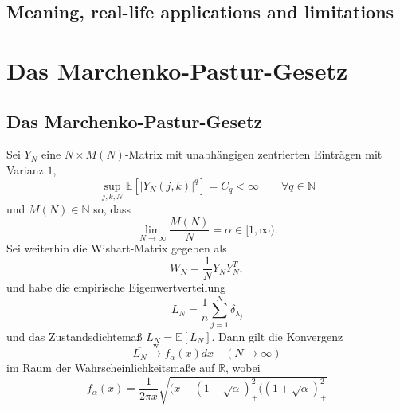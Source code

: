 \documentclass[a4paper, 11pt]{scrreprt}
\newcommand{\RR}{\mathbb{R}}
\newcommand{\EE}{\mathbb{E}}
\newcommand{\NN}{\mathbb{N}}
\begin{document}
\section{Meaning, real-life applications and limitations}

\chapter{Das Marchenko-Pastur-Gesetz}

\section{Das Marchenko-Pastur-Gesetz}

Sei \(Y_N\) eine \(N\times M(N)\)-Matrix mit unabhängigen zentrierten Einträgen mit Varianz \(1\),
	\[\sup_{j,k,N} \EE\left[ | Y_N(j,k)|^q\right] = C_q < \infty \qquad \forall q \in \NN\]
und \(M(N) \in \NN\) so, dass
	\[\lim_{N\to\infty} \frac{M(N)}{N} = \alpha \in[1,\infty). \]
Sei weiterhin die Wishart-Matrix gegeben als 
	\[W_N = \frac{1}{N}Y_NY_N^T,\]
und habe die empirische Eigenwertverteilung
	\[L_N = \frac{1}{n} \sum_{j=1}^{N} \delta_{\lambda_j} \]
und das Zustandsdichtemaß \(\overline{L_N} = \EE[L_N]\). Dann gilt die Konvergenz
	\[\overline{L_N} \xrightarrow{\text{w}} f_{\alpha}(x)dx \quad(N\to\infty)\]
im Raum der Wahrscheinlichkeitsmaße auf \(\RR\), wobei
	\[f_{\alpha}(x)=\frac{1}{2\pi x}\sqrt{(x-(1-\sqrt{\alpha})^2_{+}((1+\sqrt{\alpha})^2_{+}} \]
\end{document}
